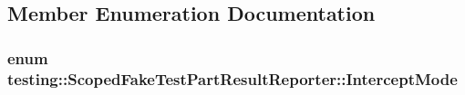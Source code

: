 \subsection{Member Enumeration Documentation}
\hypertarget{classtesting_1_1_scoped_fake_test_part_result_reporter_a82f6209b3cf5c4b15ec8bd8041dbc2d5}{
\subsubsection[{Intercept\-Mode}]{\setlength{\rightskip}{0pt plus 5cm}enum {\bf testing\-::\-Scoped\-Fake\-Test\-Part\-Result\-Reporter\-::\-Intercept\-Mode}}}\label{classtesting_1_1_scoped_fake_test_part_result_reporter_a82f6209b3cf5c4b15ec8bd8041dbc2d5}
